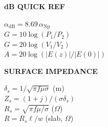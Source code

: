 \documentclass[6pt,letterpaper]{article}
\newcommand{\shead}[3]{%
  \noindent\colorbox{#1}{\parbox{\dimexpr\linewidth-2\fboxsep\relax}%
  {\color{#2}\bfseries\fontsize{6}{7}\selectfont #3}}\vspace{0.5pt}}
\begin{document}
\begin{minipage}[t]{0.19\linewidth}
\shead{graybg}{gray}{dB QUICK REF}
\begin{ebox}
$\alpha_\text{dB}=8.69\,\alpha_\text{Np}$\\
$G=10\log(P_1/P_2)$\\
$G=20\log(V_1/V_2)$\\
$A=20\log(|E(z)|/|E(0)|)$
\end{ebox}
\end{minipage}\hfill
\begin{minipage}[t]{0.19\linewidth}
\shead{coralbg}{coral}{SURFACE IMPEDANCE}
\begin{ebox}
$\delta_s=1/\sqrt{\pi f\mu\sigma}$ (m)\\
$Z_s=(1+j)/(\sigma\delta_s)$\\
$R_s=\sqrt{\pi f\mu/\sigma}$ ($\Omega$)\\
$R=R_s\ell/w$ (slab, $\Omega$)
\end{ebox}
\end{minipage}
\end{document}
